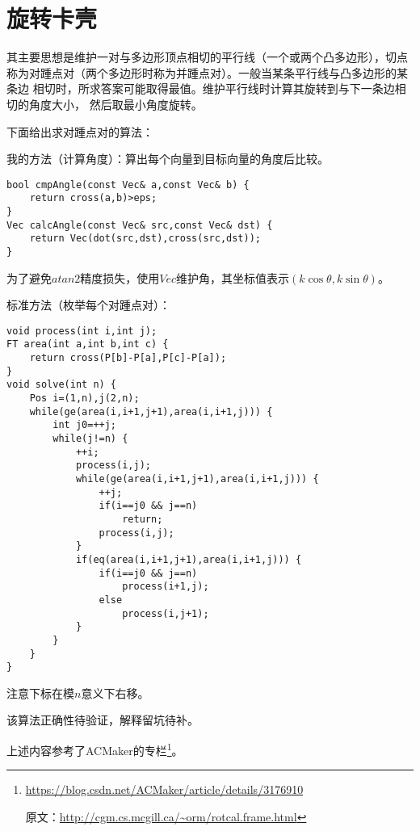 \section{旋转卡壳}
其主要思想是维护一对与多边形顶点相切的平行线（一个或两个凸多边形），切点
称为对踵点对（两个多边形时称为并踵点对）。一般当某条平行线与凸多边形的某条边
相切时，所求答案可能取得最值。维护平行线时计算其旋转到与下一条边相切的角度大小，
然后取最小角度旋转。

下面给出求对踵点对的算法：

我的方法（计算角度）：算出每个向量到目标向量的角度后比较。
\begin{lstlisting}
bool cmpAngle(const Vec& a,const Vec& b) {
    return cross(a,b)>eps;
}
Vec calcAngle(const Vec& src,const Vec& dst) {
    return Vec(dot(src,dst),cross(src,dst));
}
\end{lstlisting}

为了避免$atan2$精度损失，使用$Vec$维护角，其坐标值表示$(k\cos \theta,k\sin \theta)$。

标准方法（枚举每个对踵点对）：
\begin{lstlisting}
void process(int i,int j);
FT area(int a,int b,int c) {
    return cross(P[b]-P[a],P[c]-P[a]);
}
void solve(int n) {
    Pos i=(1,n),j(2,n);
    while(ge(area(i,i+1,j+1),area(i,i+1,j))) {
        int j0=++j;
        while(j!=n) {
            ++i;
            process(i,j);
            while(ge(area(i,i+1,j+1),area(i,i+1,j))) {
                ++j;
                if(i==j0 && j==n)
                    return;
                process(i,j);
            }
            if(eq(area(i,i+1,j+1),area(i,i+1,j))) {
                if(i==j0 && j==n)
                    process(i+1,j);
                else
                    process(i,j+1);
            }
        }
    }
}
\end{lstlisting}
注意下标在模$n$意义下右移。

该算法正确性待验证，解释留坑待补。

上述内容参考了ACMaker的专栏\footnote{
    \url{https://blog.csdn.net/ACMaker/article/details/3176910}

    原文：\url{http://cgm.cs.mcgill.ca/\~orm/rotcal.frame.html}
}。
